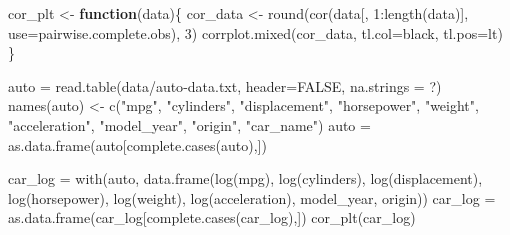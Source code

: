 \documentclass[
]{article}
\newenvironment{Shaded}{\begin{snugshade}}{\end{snugshade}}
\newcommand{\AttributeTok}[1]{\textcolor[rgb]{0.77,0.63,0.00}{#1}}
\newcommand{\ConstantTok}[1]{\textcolor[rgb]{0.00,0.00,0.00}{#1}}
\newcommand{\ControlFlowTok}[1]{\textcolor[rgb]{0.13,0.29,0.53}{\textbf{#1}}}
\newcommand{\DecValTok}[1]{\textcolor[rgb]{0.00,0.00,0.81}{#1}}
\newcommand{\FunctionTok}[1]{\textcolor[rgb]{0.00,0.00,0.00}{#1}}
\newcommand{\NormalTok}[1]{#1}
\newcommand{\OtherTok}[1]{\textcolor[rgb]{0.56,0.35,0.01}{#1}}
\newcommand{\SpecialCharTok}[1]{\textcolor[rgb]{0.00,0.00,0.00}{#1}}
\newcommand{\StringTok}[1]{\textcolor[rgb]{0.31,0.60,0.02}{#1}}
\begin{document}
\begin{Shaded}
\begin{Highlighting}[]
\NormalTok{cor\_plt }\OtherTok{\textless{}{-}} \ControlFlowTok{function}\NormalTok{(data)\{}
\NormalTok{  cor\_data }\OtherTok{\textless{}{-}} \FunctionTok{round}\NormalTok{(}\FunctionTok{cor}\NormalTok{(data[, }\DecValTok{1}\SpecialCharTok{:}\FunctionTok{length}\NormalTok{(data)], }\AttributeTok{use=}\StringTok{\textquotesingle{}pairwise.complete.obs\textquotesingle{}}\NormalTok{), }\DecValTok{3}\NormalTok{)}
  \FunctionTok{corrplot.mixed}\NormalTok{(cor\_data, }\AttributeTok{tl.col=}\StringTok{\textquotesingle{}black\textquotesingle{}}\NormalTok{, }\AttributeTok{tl.pos=}\StringTok{\textquotesingle{}lt\textquotesingle{}}\NormalTok{)}
\NormalTok{\}}

\NormalTok{auto }\OtherTok{=} \FunctionTok{read.table}\NormalTok{(}\StringTok{\textquotesingle{}data/auto{-}data.txt\textquotesingle{}}\NormalTok{, }\AttributeTok{header=}\ConstantTok{FALSE}\NormalTok{, }\AttributeTok{na.strings =} \StringTok{\textquotesingle{}?\textquotesingle{}}\NormalTok{)}
\FunctionTok{names}\NormalTok{(auto) }\OtherTok{\textless{}{-}} \FunctionTok{c}\NormalTok{(}\StringTok{"mpg"}\NormalTok{, }\StringTok{"cylinders"}\NormalTok{, }\StringTok{"displacement"}\NormalTok{, }\StringTok{"horsepower"}\NormalTok{, }\StringTok{"weight"}\NormalTok{, }
                 \StringTok{"acceleration"}\NormalTok{, }\StringTok{"model\_year"}\NormalTok{, }\StringTok{"origin"}\NormalTok{, }\StringTok{"car\_name"}\NormalTok{)}
\NormalTok{auto }\OtherTok{=} \FunctionTok{as.data.frame}\NormalTok{(auto[}\FunctionTok{complete.cases}\NormalTok{(auto),])}

\NormalTok{car\_log }\OtherTok{=} \FunctionTok{with}\NormalTok{(auto, }\FunctionTok{data.frame}\NormalTok{(}\FunctionTok{log}\NormalTok{(mpg),}
                                \FunctionTok{log}\NormalTok{(cylinders),}
                                \FunctionTok{log}\NormalTok{(displacement),}
                                \FunctionTok{log}\NormalTok{(horsepower),}
                                \FunctionTok{log}\NormalTok{(weight),}
                                \FunctionTok{log}\NormalTok{(acceleration),}
\NormalTok{                                model\_year,}
\NormalTok{                                origin))}
\NormalTok{car\_log }\OtherTok{=} \FunctionTok{as.data.frame}\NormalTok{(car\_log[}\FunctionTok{complete.cases}\NormalTok{(car\_log),])}
\FunctionTok{cor\_plt}\NormalTok{(car\_log)}
\end{Highlighting}
\end{Shaded}
\end{document}
